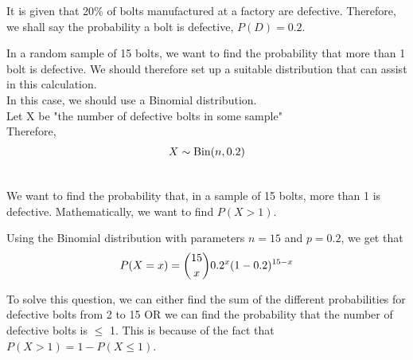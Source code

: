 %
%
%

\begin{subquestions}
	
	
\subquestion

It is given that 20\% of bolts manufactured at a factory are defective. Therefore, we shall say the probability a bolt is defective, $P(D)= 0.2$. 

\begin{subsubquestions}
	
	
\subsubquestion	
In a random sample of 15 bolts, we want to find the probability that more than 1 bolt is defective. We should therefore set up a suitable distribution that can assist in this calculation. \\
In this case, we should use a Binomial distribution.\\

Let X be "the number of defective bolts in some sample" \\
Therefore, 
\begin{align}
 X \sim \text{Bin}(n,0.2) \nonumber	\\ \nonumber
	\end{align}


We want to find the probability that, in a sample of 15 bolts, more than 1 is defective. Mathematically, we want to find $P(X>1)$.

Using the Binomial distribution with parameters $n=15$ and $p=0.2$, we get that
\begin{align}
		P(X = x) = { 15 \choose x} 0.2^x (1-0.2)^{15-x} \nonumber
\end{align}

To solve this question, we can either find the sum of the different probabilities for defective bolts from 2 to 15 OR we can find the probability that the number of defective bolts is $\leq$ 1. This is because of the fact that $P(X>1)=1-P(X\leq1)$.  \\


\end{subsubquestions}
\end{subquestions}
